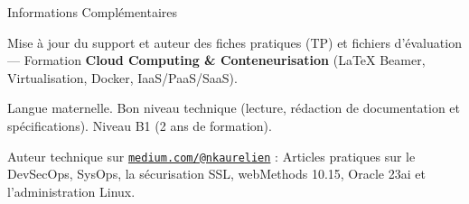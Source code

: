 \begin{rubric}{Informations Complémentaires}

 Mise à jour du support et auteur des fiches pratiques (TP) et fichiers d'évaluation --- Formation \textbf{Cloud Computing \& Conteneurisation} (LaTeX Beamer, Virtualisation, Docker, IaaS/PaaS/SaaS).

\entry*[Français] Langue maternelle.
\entry*[Anglais] Bon niveau technique (lecture, rédaction de documentation et spécifications).
\entry*[Allemand] Niveau B1 (2 ans de formation).

\entry*[Medium] Auteur technique sur \href{https://medium.com/@nkaurelien}{\texttt{medium.com/@nkaurelien}} : Articles pratiques sur le DevSecOps, SysOps, la sécurisation SSL, webMethods 10.15, Oracle 23ai et l'administration Linux.

\end{rubric}
